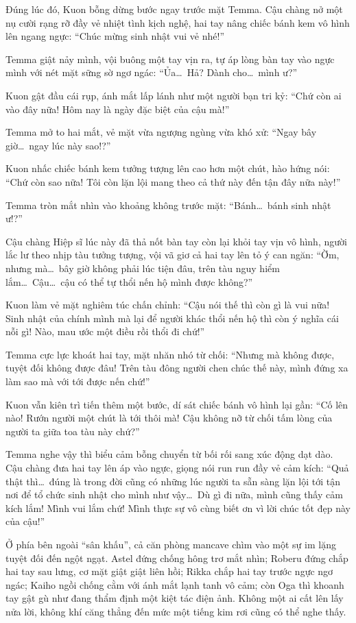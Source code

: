 \documentclass[../main.tex]{subfiles}
\begin{document}
Đúng lúc đó, Kuon bỗng dừng bước ngay trước mặt Temma. Cậu chàng nở một nụ cười rạng rỡ đầy vẻ nhiệt tình kịch nghệ, hai tay nâng chiếc bánh kem vô hình lên ngang ngực:  ``Chúc mừng sinh nhật vui vẻ nhé!''

Temma giật nảy mình, vội buông một tay vịn ra, tự áp lòng bàn tay vào ngực mình với nét mặt sững sờ ngơ ngác: ``Ủa\dots\ Hả? Dành cho\dots\ mình ư?''

Kuon gật đầu cái rụp, ánh mắt lấp lánh như một người bạn tri kỷ: ``Chứ còn ai vào đây nữa! Hôm nay là ngày đặc biệt của cậu mà!''

Temma mở to hai mắt, vẻ mặt vừa ngượng ngùng vừa khó xử: ``Ngay bây giờ\dots\ ngay lúc này sao!?''

Kuon nhấc chiếc bánh kem tưởng tượng lên cao hơn một chút, hào hứng nói: ``Chứ còn sao nữa! Tôi còn lặn lội mang theo cả thứ này đến tận đây nữa này!''

Temma tròn mắt nhìn vào khoảng không trước mặt: ``Bánh\dots\ bánh sinh nhật ư!?''

Cậu chàng Hiệp sĩ lúc này đã thả nốt bàn tay còn lại khỏi tay vịn vô hình, người lắc lư theo nhịp tàu tưởng tượng, vội vã giơ cả hai tay lên tỏ ý can ngăn: ``Ờm, nhưng mà\dots\ bây giờ không phải lúc tiện đâu, trên tàu nguy hiểm lắm\dots\ Cậu\dots\ cậu có thể tự thổi nến hộ mình được không?''

Kuon làm vẻ mặt nghiêm túc chấn chỉnh: ``Cậu nói thế thì còn gì là vui nữa! Sinh nhật của chính mình mà lại để người khác thổi nến hộ thì còn ý nghĩa cái nỗi gì! Nào, mau ước một điều rồi thổi đi chứ!''

Temma cực lực khoát hai tay, mặt nhăn nhó từ chối: ``Nhưng mà không được, tuyệt đối không được đâu! Trên tàu đông người chen chúc thế này, mình đứng xa làm sao mà với tới được nến chứ!''

Kuon vẫn kiên trì tiến thêm một bước, dí sát chiếc bánh vô hình lại gần: ``Cố lên nào! Rướn người một chút là tới thôi mà! Cậu không nỡ từ chối tấm lòng của người ta giữa toa tàu này chứ?''

Temma nghe vậy thì biểu cảm bỗng chuyển từ bối rối sang xúc động dạt dào. Cậu chàng đưa hai tay lên áp vào ngực, giọng nói run run đầy vẻ cảm kích: ``Quả thật thì\dots\ đúng là trong đời cũng có những lúc người ta sẵn sàng lặn lội tới tận nơi để tổ chức sinh nhật cho mình như vậy\dots\ Dù gì đi nữa, mình cũng thấy cảm kích lắm! Mình vui lắm chứ! Mình thực sự vô cùng biết ơn vì lời chúc tốt đẹp này của cậu!''

Ở phía bên ngoài ``sân khấu'', cả căn phòng mancave chìm vào một sự im lặng tuyệt đối đến ngột ngạt. Astel đứng chống hông trơ mắt nhìn; Roberu đứng chắp hai tay sau lưng, cơ mặt giật giật liên hồi; Rikka chắp hai tay trước ngực ngơ ngác; Kaiho ngồi chống cằm với ánh mắt lạnh tanh vô cảm; còn Oga thì khoanh tay gật gù như đang thẩm định một kiệt tác điện ảnh. Không một ai cất lên lấy nửa lời, không khí căng thẳng đến mức một tiếng kim rơi cũng có thể nghe thấy.
\end{document}

